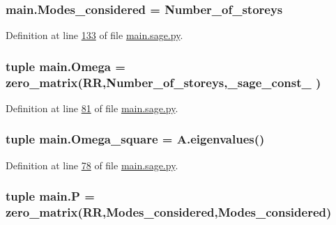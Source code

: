 \hypertarget{namespacemain_a9d22ac077c22a97b1b095068a1500d16}{}
\subsubsection[{Modes\+\_\+considered}]{\setlength{\rightskip}{0pt plus 5cm}main.\+Modes\+\_\+considered = Number\+\_\+of\+\_\+storeys}\label{namespacemain_a9d22ac077c22a97b1b095068a1500d16}


Definition at line \hyperlink{main_8sage_8py_source_l00133}{133} of file \hyperlink{main_8sage_8py_source}{main.\+sage.\+py}.

\hypertarget{namespacemain_af44dcb60e61649c65257466d65b4d548}{}
\subsubsection[{Omega}]{\setlength{\rightskip}{0pt plus 5cm}tuple main.\+Omega = zero\+\_\+matrix(R\+R,Number\+\_\+of\+\_\+storeys,\+\_\+sage\+\_\+const\+\_ )}\label{namespacemain_af44dcb60e61649c65257466d65b4d548}


Definition at line \hyperlink{main_8sage_8py_source_l00081}{81} of file \hyperlink{main_8sage_8py_source}{main.\+sage.\+py}.

\hypertarget{namespacemain_a63066086ca439ff34de16475b00387f5}{}
\subsubsection[{Omega\+\_\+square}]{\setlength{\rightskip}{0pt plus 5cm}tuple main.\+Omega\+\_\+square = A.\+eigenvalues()}\label{namespacemain_a63066086ca439ff34de16475b00387f5}


Definition at line \hyperlink{main_8sage_8py_source_l00078}{78} of file \hyperlink{main_8sage_8py_source}{main.\+sage.\+py}.

\hypertarget{namespacemain_ad403610ba53df02f8dfaff8dd64227b3}{}
\subsubsection[{P}]{\setlength{\rightskip}{0pt plus 5cm}tuple main.\+P = zero\+\_\+matrix(R\+R,{\bf Modes\+\_\+considered},{\bf Modes\+\_\+considered})}\label{namespacemain_ad403610ba53df02f8dfaff8dd64227b3}


